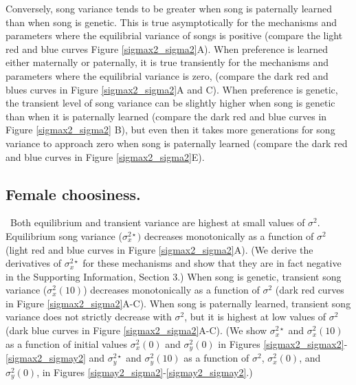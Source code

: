 \documentclass[12pt]{article}
\begin{document}
Conversely, song variance tends to be greater when song is paternally learned than when song is genetic. This is true asymptotically for the mechanisms and parameters where the equilibrial variance of songs is positive (compare the light red and blue curves Figure \ref{sigmax2_sigma2}A). When preference is learned either maternally or paternally, it is true transiently for the mechanisms and parameters where the equilibrial variance is zero,  (compare the dark red and blues curves in Figure \ref{sigmax2_sigma2}A and C). When preference is genetic, the transient level of song variance can be slightly higher when song is genetic than when it is paternally learned (compare the dark red and blue curves in Figure \ref{sigmax2_sigma2} B), but even then it takes more generations for song variance to approach zero when song is paternally learned (compare the dark red and blue curves in Figure \ref{sigmax2_sigma2}E).



\subsection*{Female choosiness. }
\ Both equilibrium and transient variance are highest at small values of $\sigma^2$. Equilibrium song variance ($\sigma_x^{2\star})$ decreases monotonically as a function of $\sigma^2$ (light red and blue curves in Figure \ref{sigmax2_sigma2}A). (We derive the derivatives of $\sigma_x^{2\star}$ for these mechanisms and show that they are in fact negative in the Supporting Information, Section 3.) When song is genetic, transient song variance ($\sigma_x^2(10)$) decreases monotonically as a function of $\sigma^2$ (dark red curves in Figure \ref{sigmax2_sigma2}A-C). When song is paternally learned, transient song variance does not strictly decrease with $\sigma^2$, but it is highest at low values of $\sigma^2$ (dark blue curves in Figure \ref{sigmax2_sigma2}A-C).  (We show $\sigma_x^{2\star}$  and $\sigma_x^2(10)$ as a function of initial values $\sigma_x^2(0)$ and $\sigma_y^2(0)$ in Figures \ref{sigmax2_sigmax2}-\ref{sigmax2_sigmay2} and $\sigma_y^{2\star}$ and $\sigma_y^2(10)$ as a function of $\sigma^2$, $\sigma_x^2(0)$, and $\sigma_y^2(0)$, in Figures \ref{sigmay2_sigma2}-\ref{sigmay2_sigmay2}.)
\end{document}
